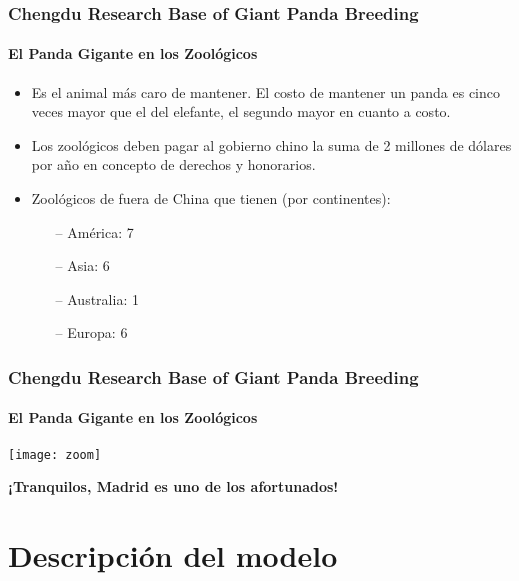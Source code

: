 \documentclass[10pt,a4paper]{beamer}
\theoremstyle{definition}
\theoremstyle{remark}
\begin{document}
\begin{frame}
\frametitle{\large{Chengdu Research Base of Giant Panda Breeding}}
\framesubtitle{El Panda Gigante en los Zoológicos}
\begin{itemize}
\item Es el animal más caro de mantener. El costo de mantener un panda es cinco veces mayor que el del elefante, el segundo mayor en cuanto a costo.
\item Los zoológicos deben pagar al gobierno chino la suma de 2 millones de dólares por año en concepto de derechos y honorarios.
\item Zoológicos de fuera de China que tienen (por continentes):
\begin{itemize}
\item[--] América: 7
\item[--] Asia: 6
\item[--] Australia: 1
\item[--] Europa: 6
\end{itemize}
\end{itemize}

\end{frame}

\begin{frame}
\frametitle{\large{Chengdu Research Base of Giant Panda Breeding}}
\framesubtitle{El Panda Gigante en los Zoológicos}
\begin{center}
\texttt{[image: zoom]}

\textbf{¡Tranquilos, Madrid es uno de los afortunados!}
\end{center}
\end{frame}

\section{Descripción del modelo}
\end{document}
